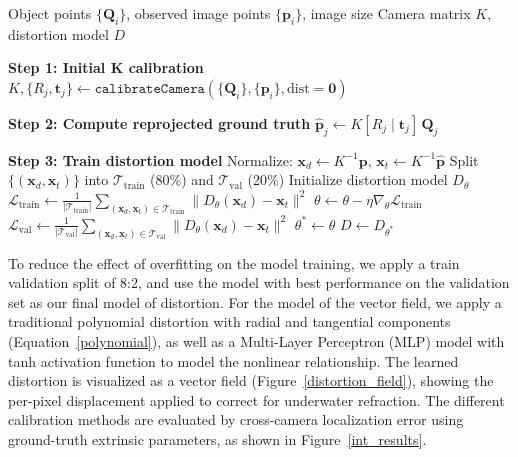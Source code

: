 \documentclass[11pt]{article}
\begin{document}
\begin{itemize}
            \begin{algorithm}
            \caption{Separate K and Distortion Calibration}\label{alg:distortion_calibration}
            \begin{algorithmic}
            \Require Object points $\{\mathbf{Q}_i\}$, observed image points $\{\mathbf{p}_i\}$, image size
            \Ensure Camera matrix $K$, distortion model $D$
            
            \State \textbf{Step 1: Initial K calibration}
            \State $K, \{R_j, \mathbf{t}_j\} \gets \texttt{calibrateCamera}(\{\mathbf{Q}_i\}, \{\mathbf{p}_i\}, \text{dist}=\mathbf{0})$
            
            \State \textbf{Step 2: Compute reprojected ground truth}
                \State $\hat{\mathbf{p}}_j \gets K [R_j \mid \mathbf{t}_j] \, \mathbf{Q}_j$ 
            \EndFor
            
            \State \textbf{Step 3: Train distortion model}
            \State Normalize: $\mathbf{x}_d \gets K^{-1} \mathbf{p}$, \quad $\mathbf{x}_t \gets K^{-1} \hat{\mathbf{p}}$
            \State Split $\{(\mathbf{x}_d, \mathbf{x}_t)\}$ into $\mathcal{T}_{\text{train}}$ (80\%) and $\mathcal{T}_{\text{val}}$ (20\%)
            \State Initialize distortion model $D_\theta$
                \State $\mathcal{L}_{\text{train}} \gets \frac{1}{|\mathcal{T}_{\text{train}}|} \sum_{(\mathbf{x}_d, \mathbf{x}_t) \in \mathcal{T}_{\text{train}}} \| D_\theta(\mathbf{x}_d) - \mathbf{x}_t \|^2$
                \State $\theta \gets \theta - \eta \nabla_\theta \mathcal{L}_{\text{train}}$
                \State $\mathcal{L}_{\text{val}} \gets \frac{1}{|\mathcal{T}_{\text{val}}|} \sum_{(\mathbf{x}_d, \mathbf{x}_t) \in \mathcal{T}_{\text{val}}} \| D_\theta(\mathbf{x}_d) - \mathbf{x}_t \|^2$
                    \State $\theta^* \gets \theta$ 
                \EndIf
            \EndFor
            \State $D \gets D_{\theta^*}$
            
            \end{algorithmic}
            \end{algorithm}

            To reduce the effect of overfitting on the model training, we apply a train validation split of 8:2, and use the model with best performance on the validation set as our final model of distortion.
            For the model of the vector field, we apply a traditional polynomial distortion with radial and tangential components (Equation~\ref{polynomial}), as well as a Multi-Layer Perceptron (MLP) model with tanh activation function to model the nonlinear relationship. The learned distortion is visualized as a vector field (Figure~\ref{distortion_field}), showing the per-pixel displacement applied to correct for underwater refraction. The different calibration methods are evaluated by cross-camera localization error using ground-truth extrinsic parameters, as shown in Figure~\ref{int_results}.


\end{itemize}
\end{document}
